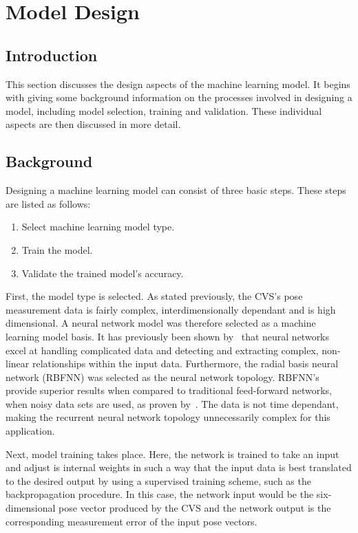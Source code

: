 \section{Model Design}

\subsection{Introduction}

This section discusses the design aspects of the machine learning model. It begins with giving some background information on the processes involved in designing a model, including model selection, training and validation. These individual aspects are then discussed in more detail. 

\subsection{Background}

Designing a machine learning model can consist of three basic steps. These steps are listed as follows:

\begin{enumerate}
  \item Select machine learning model type.
  \item Train the model.
  \item Validate the trained model's accuracy. 
\end{enumerate}

First, the model type is selected. As stated previously, the CVS's pose measurement data is fairly complex, interdimensionally dependant and is high dimensional. A neural network model was therefore selected as a machine learning model basis. It has previously been shown by~\cite{tu1996advantages} that neural networks excel at handling complicated data and detecting and extracting complex, non-linear relationships within the input data. Furthermore, the radial basis neural network (RBFNN) was selected as the neural network topology. RBFNN's provide superior results when compared to traditional feed-forward networks, when noisy data sets are used, as proven by~\cite{xie2011comparison}. The data is not time dependant, making the recurrent neural network topology unnecessarily complex for this application.  

Next, model training takes place. Here, the network is trained to take an input and adjust is internal weights in such a way that the input data is best translated to the desired output by using a supervised training scheme, such as the backpropagation procedure. In this case, the network input would be the six-dimensional pose vector produced by the CVS and the network output is the corresponding measurement error of the input pose vectors.  

